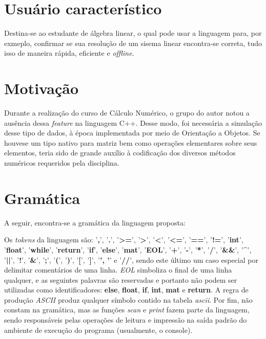 \documentclass[
	article,			%
	11pt,				%
	oneside,			%
	a4paper,			%
	english,			%
	brazil,				%
	sumario=tradicional
	]{abntex2}
\renewcommand{\it}[1]{\textit{#1}}
\renewcommand{\bf}[1]{\textbf{#1}}
\begin{document}
\section{Usuário característico}
Destina-se ao estudante de álgebra linear, o qual pode usar a linguagem para, por exmeplo, confirmar se sua resolução de um sisema linear encontra-se correta, tudo isso de maneira rápida, eficiente e \it{offline}.

\section{Motivação}
Durante a realização do curso de Cálculo Numérico, o grupo do autor notou a ausência dessa \it{feature} na linguagem C++. Desse modo, foi necessária a simulação desse tipo de dados, à época implementada por meio de Orientação a Objetos. Se houvese um tipo nativo para matriz bem como operações elementares sobre seus elementos, teria sido de grande auxílio à codificação dos diversos métodos numéricos requeridos pela disciplina.


\section{Gramática}
A seguir, encontra-se a gramática da linguagem proposta:
	
Os \textit{tokens} da linguagem são: '\bf{,}', '\bf{.}', '\bf{>=}', '\bf{>}', '\bf{<}', '\bf{<=}', '\bf{==}', '\bf{!=}', '\bf{int}', '\bf{float}', '\bf{while}', '\bf{return}', '\bf{if}', '\bf{else}', '\bf{mat}', '\bf{EOL}', '\bf{+}', '\bf{-}', '\bf{*}', '\bf{/}', '\bf{\&\&}', '\bf{\^}', '\bf{||}', '\bf{!}', '\bf{\&}', '\bf{;}', '\bf{(}', '\bf{)}', '\bf{[}', '\bf{]}', '\bf{{}', '\bf{}}' e '\bf{//}',  sendo este último um caso especial por delimitar comentários de uma linha. \it{EOL} simboliza o final de uma linha qualquer, e as seguintes palavras são reservadas e portanto não podem ser utilizadas como identificadores: \bf{else}, \bf{float}, \bf{if}, \bf{int}, \bf{mat} e \bf{return}. A regra de produção \it{ASCII} produz qualquer símbolo contido na tabela \it{ascii}. Por fim, não constam na gramática, mas as funções  \it{scan} e \it{print} fazem parte da linguagem, sendo responsáveis pelas operações de leitura e impressão na saída padrão do ambiente de execução do programa (usualmente, o console).
\end{document}
